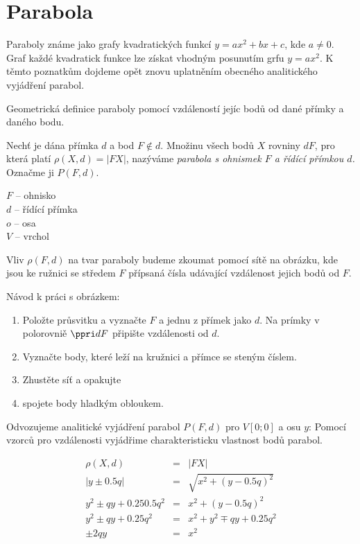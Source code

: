 
\BeginDoc{}
\section{Parabola}
\Poz Paraboly známe jako grafy kvadratických funkcí $y=ax^2 + bx + c$, kde $a\neq 0$.
Graf každé kvadratick funkce lze získat vhodným posunutím grfu $y=ax^2$.
K těmto poznatkům dojdeme opět znovu uplatněním obecného analitického vyjádření parabol.

Geometrická definice paraboly pomocí vzdáleností jejíc bodů od dané přímky a daného bodu.

\Def
Nechť je dána přímka $d$ a bod $F\not \in d$.
Množinu všech bodů $X$ rovniny $dF$, pro která platí $\rho (X,d) = |FX|$, nazýváme \emph{parabola s ohnismek $F$ a řídící přímkou $d$.}
Označme ji $P(F,d)$.

\Poz
{}
$F$ -- ohnisko\\
$d$ -- řídící přímka\\
$o$ -- osa\\
$V$ -- vrchol

\Poz Vliv $\rho(F,d)$ na tvar paraboly budeme zkoumat pomocí sítě na obrázku, kde jsou ke ružnici se středem $F$ přípsaná čísla udávající vzdálenost jejich bodů od $F$.

Návod k práci s obrázkem:
\begin{enumerate}
	\item Položte průsvitku a vyznačte $F$ a jednu z přímek jako $d$.
		Na prímky v polorovniě $\ve{dF}$ připište vzdálenosti od $d$.
	\item Vyznačte body, které leží na kružnici a přímce se steným číslem.
	\item Zhustěte síť a opakujte
	\item spojete body hladkým obloukem.
\end{enumerate}

\Poz Odvozujeme analitické vyjádření parabol $P(F,d)$ pro $V[0;0]$ a osu $y$:
Pomocí vzorců pro vzdálenosti vyjádřime charakteristicku vlastnost bodů parabol.

\begin{eqnarray*}
	\rho(X,d) &=& |FX|\\
	|y\pm 0.5 q| &=& \sqrt{x^2 + (y-0.5q)^2}\\
	y^2\pm qy + 0.25 0.5 q^2 &=& x^2 + (y-0.5q)^2\\
	y^2 \pm qy + 0.25 q^2 &=& x^2 + y^2 \mp qy + 0.25 q^2\\
	\pm 2qy &=& x^2
\end{eqnarray*}

